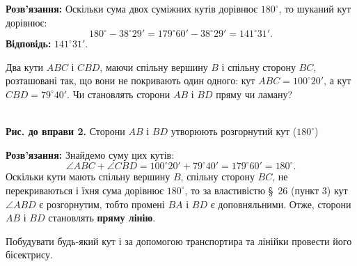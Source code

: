\textbf{Розв'язання:}
Оскільки сума двох суміжних кутів дорівнює $180^\circ$, то шуканий кут дорівнює:
\[
180^\circ - 38^\circ 29' = 179^\circ 60' - 38^\circ 29' = 141^\circ 31'.
\]
\textbf{Відповідь:} $141^\circ 31'$.

\vspace{0.4cm}

\begin{problem}
Два кути $ABC$ і $CBD$, маючи спільну вершину $B$ і спільну сторону $BC$, розташовані так, що вони не покривають один одного: кут $ABC = 100^\circ 20'$, а кут $CBD = 79^\circ 40'$. Чи становлять сторони $AB$ і $BD$ пряму чи ламану?
\end{problem}

\begin{center}
\\[4pt]
{\small\textbf{Рис. до вправи 2.} Сторони $AB$ і $BD$ утворюють розгорнутий кут ($180^\circ$)}
\end{center}

\textbf{Розв'язання:}
Знайдемо суму цих кутів:
\[
\angle ABC + \angle CBD = 100^\circ 20' + 79^\circ 40' = 179^\circ 60' = 180^\circ.
\]
Оскільки кути мають спільну вершину $B$, спільну сторону $BC$, не перекриваються і їхня сума дорівнює $180^\circ$, то за властивістю §~26 (пункт 3) кут $\angle ABD$ є розгорнутим, тобто промені $BA$ і $BD$ є доповняльними. Отже, сторони $AB$ і $BD$ становлять \textbf{пряму лінію}.

\vspace{0.4cm}

\begin{problem}
Побудувати будь-який кут і за допомогою транспортира та лінійки провести його бісектрису.
\end{problem}

